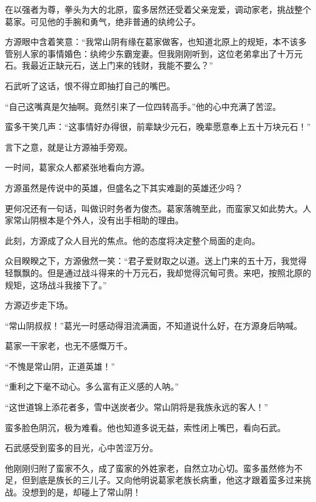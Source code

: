 
\begin{this_body}



在以强者为尊，拳头为大的北原，蛮多居然还受着父亲宠爱，调动家老，挑战整个葛家。可见他的手腕和勇气，绝非普通的纨绔公子。

方源眼中含着笑意：“我常山阴有缘在葛家做客，也知道北原上的规矩，本不该多管别人家的事情婚色：纨绔少东霸宠妻。但我刚刚听到，这位老弟拿出了十万元石。我最近正缺元石，送上门来的钱财，我能不要么？”

石武听了这话，恨不得立即抽打自己的嘴巴。

“自己这嘴真是欠抽啊。竟然引来了一位四转高手。”他的心中充满了苦涩。

蛮多干笑几声：“这事情好办得很，前辈缺少元石，晚辈愿意奉上五十万块元石！”

言下之意，就是让方源袖手旁观。

一时间，葛家众人都紧张地看向方源。

方源虽然是传说中的英雄，但盛名之下其实难副的英雄还少吗？

更何况还有一句话，叫做识时务者为俊杰。葛家落魄至此，而蛮家又如此势大。人家常山阴根本是个外人，没有出手相助的理由。

此刻，方源成了众人目光的焦点。他的态度将决定整个局面的走向。

众目睽睽之下，方源傲然一笑：“君子爱财取之以道。送上门来的五十万，我觉得轻飘飘的。但是通过战斗得来的十万元石，我却觉得沉甸可贵。来吧，按照北原的规矩，这场战斗我接下了。”

方源迈步走下场。

“常山阴叔叔！”葛光一时感动得泪流满面，不知道说什么好，在方源身后呐喊。

葛家一干家老，也无不感慨万千。

“不愧是常山阴，正道英雄！”

“重利之下毫不动心。多么富有正义感的人呐。”

“这世道锦上添花者多，雪中送炭者少。常山阴将是我族永远的客人！”

蛮多脸色阴沉，极为难看。他也知道多说无益，索性闭上嘴巴，看向石武。

石武感受到蛮多的目光，心中苦涩万分。

他刚刚归附了蛮家不久，成了蛮家的外姓家老，自然立功心切。蛮多虽然修为不足，但到底是族长的三儿子。又向他明说葛家老族长病重，他这才跟着蛮多过来挑战。没想到的是，却碰上了常山阴！


\end{this_body}
